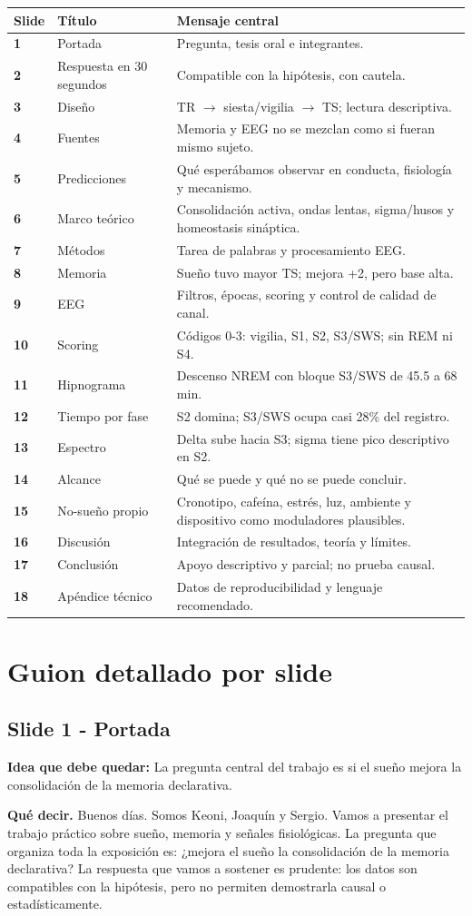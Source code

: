 \documentclass[11pt,a4paper]{article}
\newcommand{\slidehead}[3]{%
\subsection*{Slide #1 - #2}\textbf{Idea que debe quedar:} #3\par}
\newcommand{\decir}{\textbf{Qué decir.} }
\begin{document}
\begin{longtable}{>{\bfseries}p{1.1cm}p{4.1cm}p{8.7cm}}
\toprule
Slide & Título & Mensaje central \\
\midrule
1 & Portada & Pregunta, tesis oral e integrantes. \\
2 & Respuesta en 30 segundos & Compatible con la hipótesis, con cautela. \\
3 & Diseño & TR $\rightarrow$ siesta/vigilia $\rightarrow$ TS; lectura descriptiva. \\
4 & Fuentes & Memoria y EEG no se mezclan como si fueran mismo sujeto. \\
5 & Predicciones & Qué esperábamos observar en conducta, fisiología y mecanismo. \\
6 & Marco teórico & Consolidación activa, ondas lentas, sigma/husos y homeostasis sináptica. \\
7 & Métodos & Tarea de palabras y procesamiento EEG. \\
8 & Memoria & Sueño tuvo mayor TS; mejora +2, pero base alta. \\
9 & EEG & Filtros, épocas, scoring y control de calidad de canal. \\
10 & Scoring & Códigos 0-3: vigilia, S1, S2, S3/SWS; sin REM ni S4. \\
11 & Hipnograma & Descenso NREM con bloque S3/SWS de 45.5 a 68 min. \\
12 & Tiempo por fase & S2 domina; S3/SWS ocupa casi 28\% del registro. \\
13 & Espectro & Delta sube hacia S3; sigma tiene pico descriptivo en S2. \\
14 & Alcance & Qué se puede y qué no se puede concluir. \\
15 & No-sueño propio & Cronotipo, cafeína, estrés, luz, ambiente y dispositivo como moduladores plausibles. \\
16 & Discusión & Integración de resultados, teoría y límites. \\
17 & Conclusión & Apoyo descriptivo y parcial; no prueba causal. \\
18 & Apéndice técnico & Datos de reproducibilidad y lenguaje recomendado. \\
\bottomrule
\end{longtable}

\newpage
\section{Guion detallado por slide}

\slidehead{1}{Portada}{La pregunta central del trabajo es si el sueño mejora la consolidación de la memoria declarativa.}
\decir Buenos días. Somos Keoni, Joaquín y Sergio. Vamos a presentar el trabajo práctico sobre sueño, memoria y señales fisiológicas. La pregunta que organiza toda la exposición es: ¿mejora el sueño la consolidación de la memoria declarativa? La respuesta que vamos a sostener es prudente: los datos son compatibles con la hipótesis, pero no permiten demostrarla causal o estadísticamente.
\end{document}

